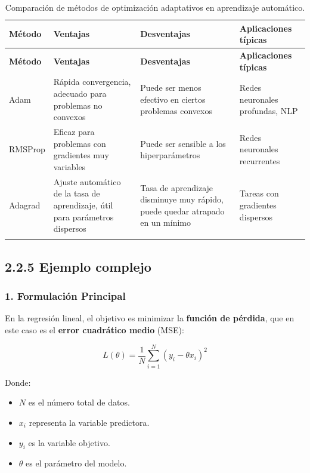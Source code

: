 \documentclass{article}
\begin{document}
\begin{longtable}{|l|p{3cm}|p{3cm}|p{3cm}|}  

	\hline
	\textbf{Método} & \textbf{Ventajas} & \textbf{Desventajas} & \textbf{Aplicaciones típicas} \\ \hline
	\endfirsthead
	\hline
	\textbf{Método} & \textbf{Ventajas} & \textbf{Desventajas} & \textbf{Aplicaciones típicas} \\ \hline
	\endhead
	\hline
	Adam           & Rápida convergencia, adecuado para problemas no convexos & Puede ser menos efectivo en ciertos problemas convexos & Redes neuronales profundas, NLP \\ \hline
	RMSProp        & Eficaz para problemas con gradientes muy variables & Puede ser sensible a los hiperparámetros & Redes neuronales recurrentes \\ \hline
	Adagrad        & Ajuste automático de la tasa de aprendizaje, útil para parámetros dispersos & Tasa de aprendizaje disminuye muy rápido, puede quedar atrapado en un mínimo & Tareas con gradientes dispersos \\ \hline
	\caption{Comparación de métodos de optimización adaptativos en aprendizaje automático.} \\
\end{longtable}



\subsection*{2.2.5 Ejemplo complejo}

\subsubsection*{1. Formulación Principal}

En la regresión lineal, el objetivo es minimizar la \textbf{función de pérdida}, que en este caso es el \textbf{error cuadrático medio} (MSE):

\[
L(\theta) = \frac{1}{N} \sum_{i=1}^{N} (y_i - \theta x_i)^2
\]

Donde:
\begin{itemize}
	\item \( N \) es el número total de datos.
	\item \( x_i \) representa la variable predictora.
	\item \( y_i \) es la variable objetivo.
	\item \( \theta \) es el parámetro del modelo.
\end{itemize}
\end{document}
